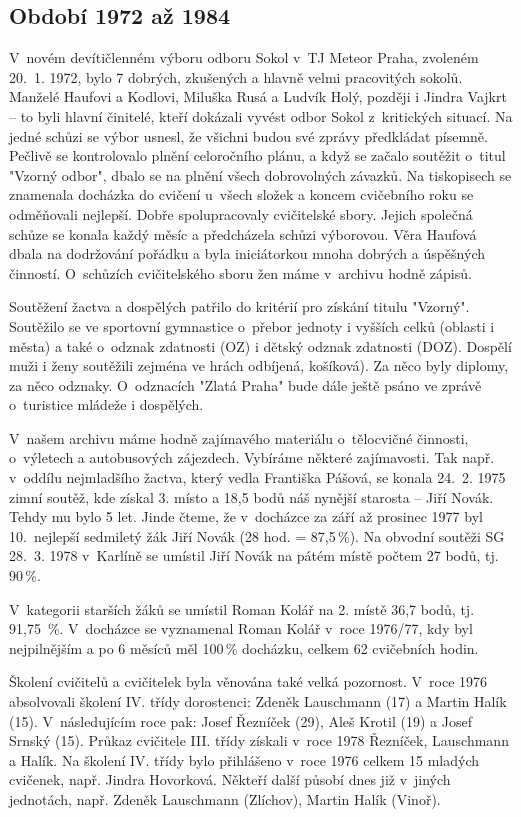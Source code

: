 \documentclass[a5paper, 11pt, twoside]{article}
\begin{document}
\subsection{Období 1972 až 1984}

V~novém devítičlenném výboru odboru Sokol v~TJ Meteor Praha, zvoleném
20.~1. 1972, bylo 7 dobrých, zkušených a hlavně velmi pracovitých
sokolů. Manželé Haufovi a Kodlovi, Miluška Rusá a Ludvík Holý, později i
Jindra Vajkrt -- to byli hlavní činitelé, kteří dokázali vyvést odbor
Sokol z~kritických situací. Na jedné schůzi se výbor usnesl, že všichni
budou své zprávy předkládat písemně. Pečlivě se kontrolovalo plnění
celoročního plánu, a když se začalo soutěžit o~titul "Vzorný odbor",
dbalo se na plnění všech dobrovolných závazků. Na tiskopisech se
znamenala docházka do cvičení u~všech složek a koncem cvičebního roku se
odměňovali nejlepší. Dobře spolupracovaly cvičitelské sbory. Jejich
společná schůze se konala každý měsíc a předcházela schůzi výborovou.
Věra Haufová dbala na dodržování pořádku a byla iniciátorkou mnoha
dobrých a úspěšných činností. O~schůzích cvičitelského sboru žen máme
v~archivu hodně zápisů.

Soutěžení žactva a dospělých patřilo do kritérií pro získání titulu
"Vzorný". Soutěžilo se ve sportovní gymnastice o~přebor jednoty i
vyšších celků (oblasti i města) a také o~odznak zdatnosti (OZ) i dětský
odznak zdatnosti (DOZ). Dospělí muži i ženy soutěžili zejména ve hrách
odbíjená, košíková). Za něco byly diplomy, za něco odznaky. O~odznacích
"Zlatá Praha" bude dále ještě psáno ve zprávě o~turistice mládeže i
dospělých.

V~našem archivu máme hodně zajímavého materiálu o~tělocvičné činnosti,
o~výletech a autobusových zájezdech. Vybíráme některé zajímavosti. Tak
např. v~oddílu nejmladšího žactva, který vedla Františka Pášová, se
konala 24.~2. 1975 zimní soutěž, kde získal 3. místo a 18,5 bodů náš
nynější starosta -- Jiří Novák. Tehdy mu bylo 5 let. Jinde čteme, že
v~docházce za září až prosinec 1977 byl 10.~nejlepší sedmiletý žák Jiří
Novák (28 hod. = 87,5\,\%). Na obvodní soutěži SG 28.~3. 1978 v~Karlíně
se umístil Jiří Novák na pátém místě počtem 27 bodů, tj. 90\,\%.

V~kategorii starších žáků se umístil Roman Kolář na 2. místě 36,7 bodů,
tj. 91,75~\%. V~docházce se vyznamenal Roman Kolář v~roce 1976/77, kdy
byl nejpilnějším a po 6 měsíců měl 100\,\% docházku, celkem 62 cvičebních
hodin.

Školení cvičitelů a cvičitelek byla věnována také velká pozornost.
V~roce 1976 absolvovali školení IV. třídy dorostenci: Zdeněk Lauschmann
(17) a Martin Halík (15). V~následujícím roce pak: Josef Řezníček (29),
Aleš Krotil (19) a Josef Srnský (15). Průkaz cvičitele III. třídy
získali v~roce 1978 Řezníček, Lauschmann a Halík. Na školení IV. třídy
bylo přihlášeno v~roce 1976 celkem 15 mladých cvičenek, např. Jindra
Hovorková. Někteří další působí dnes již v~jiných jednotách, např.
Zdeněk Lauschmann (Zlíchov), Martin Halík (Vinoř).
\end{document}
